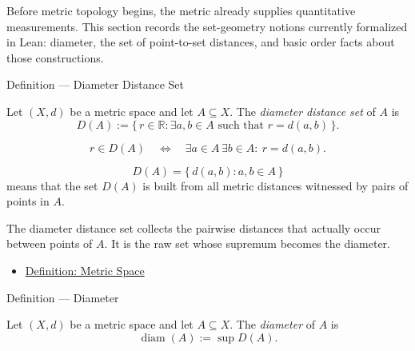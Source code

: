 \begin{remark*}[Exposition]
Before metric topology begins, the metric already supplies quantitative
measurements.  This section records the set-geometry notions currently
formalized in Lean: diameter, the set of point-to-set distances, and basic
order facts about those constructions.
\end{remark*}

\begin{definitionbox}{Definition --- Diameter Distance Set}
\begin{definition}\label{def:metric-diameter-distance-set}
Let \((X,d)\) be a metric space and let \(A\subseteq X\).  The
\emph{diameter distance set} of \(A\) is
\[
  D(A)
  :=
  \{\,r\in\mathbb{R}:\exists a,b\in A\text{ such that }r=d(a,b)\,\}.
\]
\end{definition}
\end{definitionbox}

\begin{remark*}
\[
r\in D(A)
\quad\Longleftrightarrow\quad
\exists a\in A\,\exists b\in A{:}\ r=d(a,b).
\]
\end{remark*}

\begin{remark*}
\[
D(A)=\{\,d(a,b):a,b\in A\,\}
\]
means that the set \(D(A)\) is built from all metric distances witnessed by
pairs of points in \(A\).
\end{remark*}

\begin{remark*}[Interpretation]
The diameter distance set collects the pairwise distances that actually occur
between points of \(A\).  It is the raw set whose supremum becomes the
diameter.
\end{remark*}


\begin{dependencies}
\begin{itemize}
  \item \hyperref[def:metric-space]{Definition: Metric Space}
\end{itemize}
\end{dependencies}

\begin{definitionbox}{Definition --- Diameter}
\begin{definition}[Diameter]\label{def:metric-diameter}
Let \((X,d)\) be a metric space and let \(A\subseteq X\).  The
\emph{diameter} of \(A\) is
\[
  \operatorname{diam}(A)
  :=
  \sup D(A).
\]
\end{definition}
\end{definitionbox}

